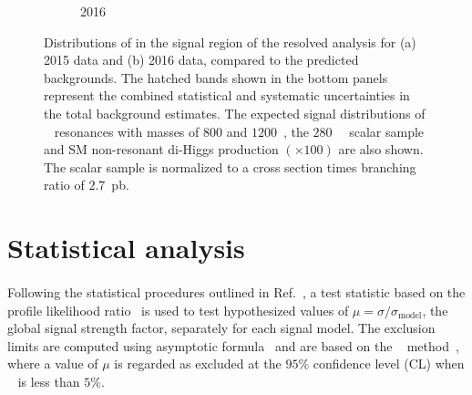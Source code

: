 \begin{figure}[htb!]
\begin{center}
\begin{subfigure}[b]{0.39\textwidth}
        \caption{2016}
        \label{fig:resolvedHHUnblinded-2016}
    \end{subfigure}
  \caption{Distributions of \mfourj in the signal region of the resolved analysis for (a) 2015 data and (b) 2016 data, compared to the predicted backgrounds. The hatched bands shown in the bottom panels represent the combined statistical and systematic uncertainties in the total background estimates. The expected signal distributions of \Grav~ resonances with masses of $800$ and $1200$~\GeV, the $280$~\GeV~ scalar sample and SM non-resonant di-Higgs production $(\times 100)$ are also shown. The scalar sample is normalized to a cross section times branching ratio of $2.7$~pb.}
  \label{fig:resolvedHHUnblinded}
\end{center}
\end{figure}


\section{Statistical analysis}
\label{sec:observedlimits}

\paragraph{}
Following the statistical procedures outlined in Ref.~\cite{Aad:2012tfa}, a test statistic based on the profile likelihood ratio~\cite{Cowan:2010js} is used to test hypothesized values of $\mu=\sigma/\sigma_{\mathrm{model}}$, the global signal strength factor, separately for each signal model. 
The exclusion limits are computed using asymptotic formula~\cite{Cowan:2010js} and are based on the \cls~ method~\cite{Read:2002hq}, where a value of $\mu$ is regarded as excluded at the $95\%$ confidence level (CL) when \cls~ is less than $5\%$.

